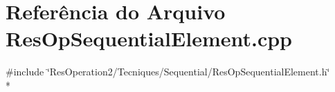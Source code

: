 \section{Referência do Arquivo Res\+Op\+Sequential\+Element.\+cpp}
\label{_res_op_sequential_element_8cpp}
{\ttfamily \#include \char`\"{}Res\+Operation2/\+Tecniques/\+Sequential/\+Res\+Op\+Sequential\+Element.\+h\char`\"{}}\\*
